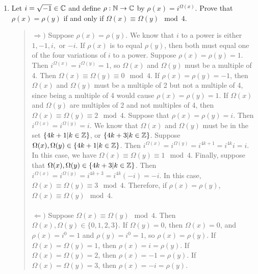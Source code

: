 \documentclass{hw}
\begin{document}
\begin{enumerate}
\item Let $i=\sqrt{-1}\in\mathbb{C}$ and define $\rho:\mathbb{N}\to\mathbb{C}$ by $\rho(x)=i^{\Omega(x)}$. Prove that
$\rho(x)=\rho(y)$ if and only if $\Omega(x)\equiv\Omega(y)\mod4$.
\begin{quote}
$\Rightarrow)$ Suppose $\rho(x)=\rho(y)$. We know that $i$ to a power is either $1,-1,i,$ or $-i$.
If $\rho(x)$ is to equal $\rho(y)$, then both must equal one of the four variations of $i$ to a
power. Suppose $\rho(x)=\rho(y)=1$. Then $i^{\Omega(x)}=i^{\Omega(y)}=1$, so $\Omega(x)$ and
$\Omega(y)$ must be a multiple of 4. Then $\Omega(x)\equiv\Omega(y)\equiv0\mod4$. If
$\rho(x)=\rho(y)=-1$, then $\Omega(x)$ and $\Omega(y)$ must be a multiple of 2 but not a multiple
of 4, since being a multiple of 4 would cause $\rho(x)=\rho(y)=1$. If $\Omega(x)$ and $\Omega(y)$
are multiples of 2 and not multiples of 4, then $\Omega(x)\equiv\Omega(y)\equiv2\mod4$. Suppose that
$\rho(x)=\rho(y)=i$. Then $i^{\Omega(x)}=i^{\Omega(y)}=i$. We know that $\Omega(x)$ and $\Omega(y)$
must be in the set $\{ 4k+1|k\in\mathbb{Z}\}$, or $\{ 4k+3|k\in\mathbb{Z}\}$. Suppose
$\Omega(x),\Omega(y)\in\{ 4k+1|k\in\mathbb{Z}\}$. Then $i^{\Omega(x)}=i^{\Omega(y)}=i^{4k+1}=i^{4k}i=i$.
In this case, we have $\Omega(x)\equiv\Omega(y)\equiv1\mod4$. Finally, suppose that
$\Omega(x),\Omega(y)\in\{ 4k+3|k\in\mathbb{Z}\}$. Then $i^{\Omega(x)}=i^{\Omega(y)}=i^{4k+3}=i^{4k}(-i)=-i$.
In this case, $\Omega(x)\equiv\Omega(y)\equiv3\mod4$. Therefore, if $\rho(x)=\rho(y)$,
$\Omega(x)\equiv\Omega(y)\mod4$.\\\\

$\Leftarrow)$ Suppose $\Omega(x)\equiv\Omega(y)\mod4$. Then $\Omega(x),\Omega(y)\in\{0,1,2,3\}$.
If $\Omega(y)=0$, then $\Omega(x)=0$, and $\rho(x)=i^{0}=1$ and $\rho(y)=i^{0}=1$, so $\rho(x)=\rho(y)$.
If $\Omega(x)=\Omega(y)=1$, then  $\rho(x)=i=\rho(y)$. If $\Omega(x)=\Omega(y)=2$, then
$\rho(x)=-1=\rho(y)$. If $\Omega(x)=\Omega(y)=3$, then $\rho(x)=-i=\rho(y)$.
\end{quote}


\end{enumerate}
\end{document}
